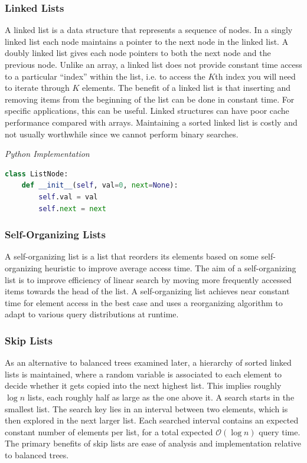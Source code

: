 \documentclass{article}
\newcommand{\bigO}{\mathcal{O}}
\begin{document}
    \subsubsection{Linked Lists}
    A linked list is a data structure that represents a sequence of nodes. In a singly linked list each node maintains a pointer to the next node in the linked list. A doubly linked list gives each node pointers to both the next node and the previous node. Unlike an array, a linked list does not provide constant time access to a particular ``index'' within the list, i.e. to access the $K$th index you will need to iterate through $K$ elements. The benefit of a linked list is that inserting and removing items from the beginning of the list can be done in constant time. For specific applications, this can be useful. Linked structures can have poor cache performance compared with arrays. Maintaining a sorted linked list is costly and not usually worthwhile since we cannot perform binary searches.

    
\vspace{8pt} \emph{Python Implementation}
\begin{lstlisting}[language=Python]
class ListNode:
    def __init__(self, val=0, next=None):
        self.val = val
        self.next = next
\end{lstlisting}
        
    \subsubsection{Self-Organizing Lists}
    A self-organizing list is a list that reorders its elements based on some self-organizing heuristic to improve average access time. The aim of a self-organizing list is to improve efficiency of linear search by moving more frequently accessed items towards the head of the list. A self-organizing list achieves near constant time for element access in the best case and uses a reorganizing algorithm to adapt to various query distributions at runtime.
    
    \subsubsection{Skip Lists}
    As an alternative to balanced trees examined later, a hierarchy of sorted linked lists is maintained, where a random variable is associated to each element to decide whether it gets copied into the next highest list. This implies roughly $\log n$ lists, each roughly half as large as the one above it. A search starts in the smallest list. The search key lies in an interval between two elements, which is then explored in the next larger list. Each searched interval contains an expected constant number of elements per list, for a total expected $\bigO(\log n)$ query time. The primary benefits of skip lists are ease of analysis and implementation relative to balanced trees.
    
\end{document}
